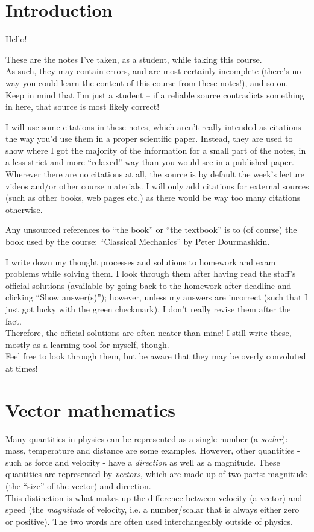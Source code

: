 \documentclass[8.01x]{subfiles}
\begin{document}
\chapter{Introduction}

Hello!

These are the notes I've taken, as a student, while taking this course.\\
As such, they may contain errors, and are most certainly incomplete (there's no way you could learn the content of this course from these notes!), and so on. Keep in mind that I'm just a student -- if a reliable source contradicts something in here, that source is most likely correct!

I will use some citations in these notes, which aren't really intended as citations the way you'd use them in a proper scientific paper. Instead, they are used to show where I got the majority of the information for a small part of the notes, in a less strict and more ``relaxed'' way than you would see in a published paper.\\
Wherever there are no citations at all, the source is by default the week's lecture videos and/or other course materials. I will only add citations for external sources (such as other books, web pages etc.) as there would be way too many citations otherwise.

Any unsourced references to ``the book'' or ``the textbook'' is to (of course) the book used by the course: ``Classical Mechanics'' by Peter Dourmashkin.

I write down my thought processes and solutions to homework and exam problems while solving them. I look through them after having read the staff's official solutions (available by going back to the homework after deadline and clicking ``Show answer(s)''); however, unless my answers are incorrect (such that I just got lucky with the green checkmark), I don't really revise them after the fact.\\
Therefore, the official solutions are often neater than mine! I still write these, mostly as a learning tool for myself, though.\\
Feel free to look through them, but be aware that they may be overly convoluted at times!

\chapter{Vector mathematics}

Many quantities in physics can be represented as a single number (a \emph{scalar}): mass, temperature and distance are some examples. However, other quantities - such as force and velocity - have a \emph{direction} as well as a magnitude. These quantities are represented by \emph{vectors}, which are made up of two parts: magnitude (the ``size'' of the vector) and direction.\\
This distinction is what makes up the difference between velocity (a vector) and speed (the \emph{magnitude} of velocity, i.e. a number/scalar that is always either zero or positive). The two words are often used interchangeably outside of physics.
\end{document}
